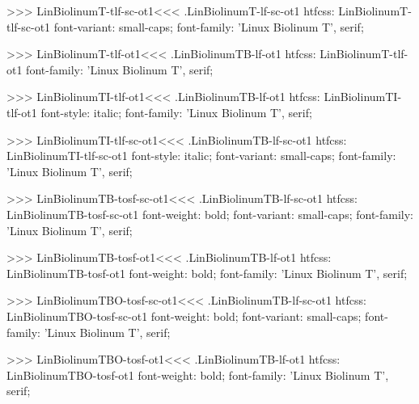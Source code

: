 {{{>>>
\<LinBiolinumT-tlf-sc-ot1\><<<
.LinBiolinumT-lf-sc-ot1
htfcss:  LinBiolinumT-tlf-sc-ot1  font-variant: small-caps; font-family: 'Linux Biolinum T', serif;

>>>
\<LinBiolinumT-tlf-ot1\><<<
.LinBiolinumTB-lf-ot1
htfcss:  LinBiolinumT-tlf-ot1  font-family: 'Linux Biolinum T', serif;

>>>
\<LinBiolinumTI-tlf-ot1\><<<
.LinBiolinumTB-lf-ot1
htfcss:  LinBiolinumTI-tlf-ot1  font-style: italic; font-family: 'Linux Biolinum T', serif;

>>>
\<LinBiolinumTI-tlf-sc-ot1\><<<
.LinBiolinumTB-lf-sc-ot1
htfcss:  LinBiolinumTI-tlf-sc-ot1  font-style: italic; font-variant: small-caps; font-family: 'Linux Biolinum T', serif;

>>>
\<LinBiolinumTB-tosf-sc-ot1\><<<
.LinBiolinumTB-lf-sc-ot1
htfcss:  LinBiolinumTB-tosf-sc-ot1  font-weight: bold; font-variant: small-caps; font-family: 'Linux Biolinum T', serif;

>>>
\<LinBiolinumTB-tosf-ot1\><<<
.LinBiolinumTB-lf-ot1
htfcss:  LinBiolinumTB-tosf-ot1  font-weight: bold; font-family: 'Linux Biolinum T', serif;

>>>
\<LinBiolinumTBO-tosf-sc-ot1\><<<
.LinBiolinumTB-lf-sc-ot1
htfcss:  LinBiolinumTBO-tosf-sc-ot1  font-weight: bold; font-variant: small-caps; font-family: 'Linux Biolinum T', serif;

>>>
\<LinBiolinumTBO-tosf-ot1\><<<
.LinBiolinumTB-lf-ot1
htfcss:  LinBiolinumTBO-tosf-ot1  font-weight: bold; font-family: 'Linux Biolinum T', serif;

}}}
